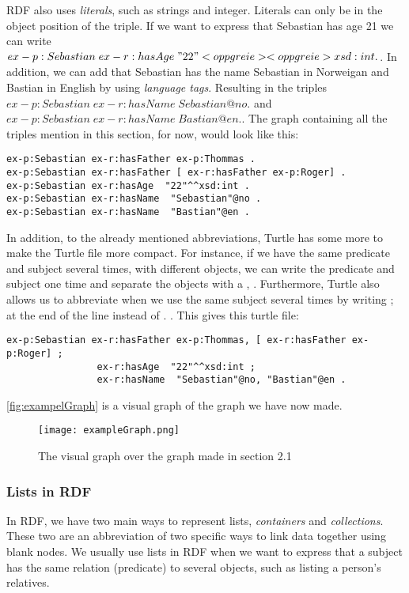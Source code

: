 \para
RDF also uses \emph{literals}, such as strings and integer. Literals can only be in the object position of the triple. If we want to express that Sebastian has age 21 we can write $ex-p:Sebastian\; ex-r:hasAge\; " 22 " <opp greie> <opp greie> xsd:int.$. In addition, we can add that Sebastian has the name Sebastian in Norweigan and Bastian in English by using \emph{language tags}. Resulting in the triples $ex-p:Sebastian\; ex-r:hasName\; Sebastian@no.$ and $ex-p:Sebastian\; ex-r:hasName\; Bastian@en.$. The graph containing all the triples mention in this section, for now, would look like this:

\begin{lstlisting}[frame=single, language=turtle]
ex-p:Sebastian ex-r:hasFather ex-p:Thommas .
ex-p:Sebastian ex-r:hasFather [ ex-r:hasFather ex-p:Roger] . 
ex-p:Sebastian ex-r:hasAge  "22"^^xsd:int . 
ex-p:Sebastian ex-r:hasName  "Sebastian"@no . 
ex-p:Sebastian ex-r:hasName  "Bastian"@en .
\end{lstlisting}

\para
In addition, to the already mentioned abbreviations, Turtle has some more to make the Turtle file more compact. For instance, if we have the same predicate and subject several times, with different objects, we can write the predicate and subject one time and separate the objects with a , . Furthermore, Turtle also allows us to abbreviate when we use the same subject several times by writing ; at the end of the line instead of . . This gives this turtle file:

\begin{lstlisting}[frame=single, language=turtle]
ex-p:Sebastian ex-r:hasFather ex-p:Thommas, [ ex-r:hasFather ex-p:Roger] ; 
                ex-r:hasAge  "22"^^xsd:int ; 
                ex-r:hasName  "Sebastian"@no, "Bastian"@en .
\end{lstlisting}
\autoref{fig:exampelGraph} is a visual graph of the graph we have now made.

\begin{figure}
    \centering
    \texttt{[image: exampleGraph.png]}
    \caption{The visual graph over the graph made in section 2.1}
    \label{fig:exampelGraph}
\end{figure}

\subsubsection{Lists in RDF}
In RDF, we have two main ways to represent lists, \emph{containers} and \emph{collections}. These two are an abbreviation of two specific ways to link data together using blank nodes.  We usually use lists in RDF when we want to express that a subject has the same relation (predicate) to several objects, such as listing a person's relatives.

